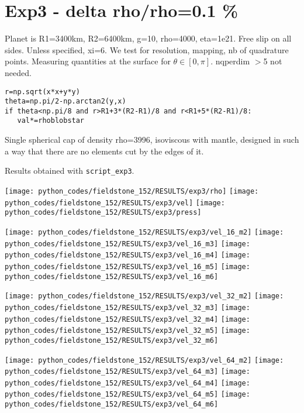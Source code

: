 \newpage
\section{Exp3 - delta rho/rho=0.1 \%}

Planet is R1=3400km, R2=6400km, g=10, rho=4000, eta=1e21.
Free slip on all sides. Unless specified, xi=6.
We test for resolution, mapping, nb of quadrature points.
Measuring quantities at the surface for $\theta\in[0,\pi]$.
nqperdim $>$5  not needed. 

\begin{lstlisting}
r=np.sqrt(x*x+y*y)
theta=np.pi/2-np.arctan2(y,x)
if theta<np.pi/8 and r>R1+3*(R2-R1)/8 and r<R1+5*(R2-R1)/8:
   val*=rhoblobstar
\end{lstlisting}

Single spherical cap of density rho=3996, isoviscous with mantle,
designed in such a way that there are no elements cut by the edges of it.

Results obtained with {\tt script\_exp3}.

\begin{center}
\texttt{[image: python\_codes/fieldstone\_152/RESULTS/exp3/rho]}
\texttt{[image: python\_codes/fieldstone\_152/RESULTS/exp3/vel]}
\texttt{[image: python\_codes/fieldstone\_152/RESULTS/exp3/press]}
\end{center}

\noindent
\texttt{[image: python\_codes/fieldstone\_152/RESULTS/exp3/vel\_16\_m2]}
\texttt{[image: python\_codes/fieldstone\_152/RESULTS/exp3/vel\_16\_m3]}
\texttt{[image: python\_codes/fieldstone\_152/RESULTS/exp3/vel\_16\_m4]}
\texttt{[image: python\_codes/fieldstone\_152/RESULTS/exp3/vel\_16\_m5]}
\texttt{[image: python\_codes/fieldstone\_152/RESULTS/exp3/vel\_16\_m6]}

\noindent
\texttt{[image: python\_codes/fieldstone\_152/RESULTS/exp3/vel\_32\_m2]}
\texttt{[image: python\_codes/fieldstone\_152/RESULTS/exp3/vel\_32\_m3]}
\texttt{[image: python\_codes/fieldstone\_152/RESULTS/exp3/vel\_32\_m4]}
\texttt{[image: python\_codes/fieldstone\_152/RESULTS/exp3/vel\_32\_m5]}
\texttt{[image: python\_codes/fieldstone\_152/RESULTS/exp3/vel\_32\_m6]}

\noindent
\texttt{[image: python\_codes/fieldstone\_152/RESULTS/exp3/vel\_64\_m2]}
\texttt{[image: python\_codes/fieldstone\_152/RESULTS/exp3/vel\_64\_m3]}
\texttt{[image: python\_codes/fieldstone\_152/RESULTS/exp3/vel\_64\_m4]}
\texttt{[image: python\_codes/fieldstone\_152/RESULTS/exp3/vel\_64\_m5]}
\texttt{[image: python\_codes/fieldstone\_152/RESULTS/exp3/vel\_64\_m6]}

